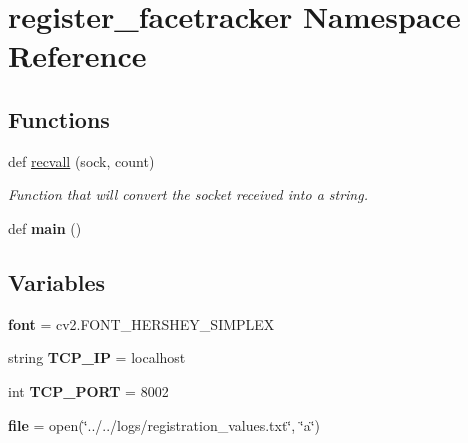 \hypertarget{namespaceregister__facetracker}{}\section{register\+\_\+facetracker Namespace Reference}
\label{namespaceregister__facetracker}
\subsection*{Functions}
\begin{DoxyCompactItemize}
\item 
def \hyperlink{namespaceregister__facetracker_a7e7317697e2ec6c09ed19d2be249da48}{recvall} (sock, count)
\begin{DoxyCompactList}\small\item\em Function that will convert the socket received into a string. \end{DoxyCompactList}\item 
def {\bfseries main} ()\hypertarget{namespaceregister__facetracker_a2020aecd0ed90359b49d4f16e5b469c9}{}\label{namespaceregister__facetracker_a2020aecd0ed90359b49d4f16e5b469c9}

\end{DoxyCompactItemize}
\subsection*{Variables}
\begin{DoxyCompactItemize}
\item 
{\bfseries font} = cv2.\+F\+O\+N\+T\+\_\+\+H\+E\+R\+S\+H\+E\+Y\+\_\+\+S\+I\+M\+P\+L\+EX\hypertarget{namespaceregister__facetracker_a40fd762d6e26811e038be5b5eabb4aef}{}\label{namespaceregister__facetracker_a40fd762d6e26811e038be5b5eabb4aef}

\item 
string {\bfseries T\+C\+P\+\_\+\+IP} = \textquotesingle{}localhost\textquotesingle{}\hypertarget{namespaceregister__facetracker_a8d029fb157738c48373876bb27ac948a}{}\label{namespaceregister__facetracker_a8d029fb157738c48373876bb27ac948a}

\item 
int {\bfseries T\+C\+P\+\_\+\+P\+O\+RT} = 8002\hypertarget{namespaceregister__facetracker_aff2158cc5bc813254a9b6253552907f7}{}\label{namespaceregister__facetracker_aff2158cc5bc813254a9b6253552907f7}

\item 
{\bfseries file} = open(\char`\"{}../../logs/registration\+\_\+values.\+txt\char`\"{}, \char`\"{}a\char`\"{})\hypertarget{namespaceregister__facetracker_a89f807184e61b9d93eef7c2c0a034fdc}{}\label{namespaceregister__facetracker_a89f807184e61b9d93eef7c2c0a034fdc}

\end{DoxyCompactItemize}


